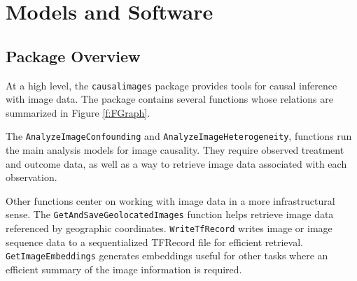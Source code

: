 \documentclass[nojss,shortnames]{jss} %
\begin{document}

\section{Models and Software} \label{s:Software}

\subsection{Package Overview}
At a high level, the \texttt{causalimages} package provides tools for causal inference with image data. The package contains several functions whose relations are summarized in Figure \ref{f:FGraph}.

The \texttt{AnalyzeImageConfounding} and \texttt{AnalyzeImageHeterogeneity}, functions run the main analysis models for image causality. They require observed treatment and outcome data, as well as a way to retrieve image data associated with each observation.

Other functions center on working with image data in a more infrastructural sense. The \texttt{GetAndSaveGeolocatedImages} function helps retrieve image data referenced by geographic coordinates. \texttt{WriteTfRecord} writes image or image sequence data to a sequentialized TFRecord file for efficient retrieval. \texttt{GetImageEmbeddings} generates embeddings useful for other tasks where an efficient summary of the image information is required. 
\end{document}
